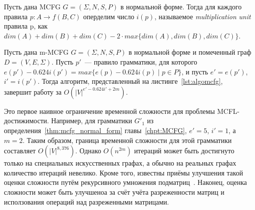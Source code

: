 \begin{definition}
	Пусть дана MCFG $G = (\Sigma, N, S, P)$ в нормальной форме. Тогда для каждого правила $p: A \rightarrow f(B,C)$ оперделим число $i(p)$, называемое \textit{multiplication unit} правила p, как $dim(A) + dim(B) + dim(C) - 2 \cdot max\{dim(A), dim(B), dim(C)\}$.
\end{definition}


\begin{theorem}\label{thm:complexity}
	Пусть дана m-MCFG $G = (\Sigma, N, S, P)$ в нормальной форме и помеченный граф $D =(V, E, \Sigma)$. Пусть $p'$~--- правило грамматики, для которого $e(p') - 0.624i(p') = max\{e(p) - 0.624i(p) \mid p\in P\}$, и пусть $e' = e(p')$, $i' = i(p')$. Тогда алгоритм, представленный на листинге~\ref{lst:algomcfg}, завершит работу за $O(|V|^{e' - 0.624i' + 2m})$.
\end{theorem}

Это первое наивное ограничение временной сложности для проблемы MCFL-достижимости. Например, для грамматики $G'_1$ из определения~\ref{thm:mcfg_normal_form} главы~\ref{chpt:MCFG}, $e' = 5$, $i' = 1$, а $m = 2$. Таким образом, граница временной сложности для этой грамматики составляет $O(|V|^{8,376})$. Однако $O(n^{2m})$ итераций может быть достигнуто только на специальных искусственных графах, а обычно на реальных графах количество итераций невелико. Кроме того, известны приёмы улучшения такой оценки сложности путём рекурсивного умножения подматриц~\cite{Valiant:1975:GCR:1739932.1740048}. Наконец, оценка сложности может быть улучшеноа за счёт учёта разреженности матриц и исползования операций над разреженными матрицами.
